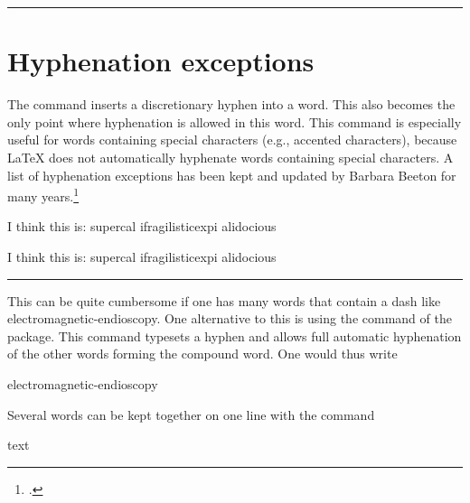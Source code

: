 {\hfill\hfill\color{orange}\rule{5cm}{1pt}\par}
\hfill\hfill{\hbox{\small}


\section{Hyphenation exceptions}

The command \cs{-}  inserts a discretionary hyphen into a word. This also becomes the only point where hyphenation is allowed in this word. This command is especially useful for words containing special characters (e.g., accented characters), because LaTeX does not automatically hyphenate words containing special characters. A list of hyphenation exceptions has been kept and updated
by Barbara Beeton for many years.\footcite{beeton2015} 

\begin{teX}
\begin{minipage}{2in}
I think this is: su\-per\-cal\-%
i\-frag\-i\-lis\-tic\-ex\-pi\-%
al\-i\-do\-cious
\end{minipage}
\end{teX}
\bigskip



\noindent{\color{orange}\rule{5cm}{1pt}\hfill\hfill\par}
\begin{center}
\par
\begin{minipage}{2in}
I think this is: su\-per\-cal\-%
i\-frag\-i\-lis\-tic\-ex\-pi\-%
al\-i\-do\-cious
\par
\end{minipage}
\end{center}
{\hfill\hfill\color{orange}\rule{5cm}{1pt}\par}
\hfill\hfill{\hbox{\small}
\bigskip

This can be quite cumbersome if one has many words that contain a dash like electromagnetic-endioscopy. One alternative to this is using the  command of the  package. This command typesets a hyphen and allows full automatic hyphenation of the other words forming the compound word. One would thus write

\begin{teX}
electromagnetic\hyp{}endioscopy
\end{teX}


Several words can be kept together on one line with the command

\begin{teX}
\mbox{text}
\end{teX}

}}
